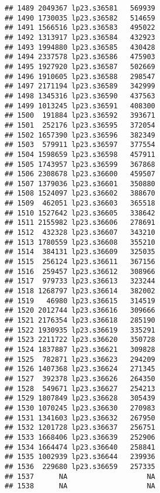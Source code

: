\documentclass[
]{article}
\begin{document}
\begin{verbatim}
## 1489 2049367 lp23.s36581   569939
## 1490 1730035 lp23.s36582   514659
## 1491 1566516 lp23.s36583   495022
## 1492 1313917 lp23.s36584   432923
## 1493 1994880 lp23.s36585   430428
## 1494 2337578 lp23.s36586   475903
## 1495 1927920 lp23.s36587   502669
## 1496 1910605 lp23.s36588   298547
## 1497 2171194 lp23.s36589   342999
## 1498 1345316 lp23.s36590   437563
## 1499 1013245 lp23.s36591   408300
## 1500  191884 lp23.s36592   393671
## 1501  252176 lp23.s36595   372054
## 1502 1657390 lp23.s36596   382349
## 1503  579911 lp23.s36597   377554
## 1504 1598659 lp23.s36598   457911
## 1505 1743957 lp23.s36599   367868
## 1506 2308678 lp23.s36600   459507
## 1507 1379036 lp23.s36601   350880
## 1508 1524097 lp23.s36602   388670
## 1509  462051 lp23.s36603   365518
## 1510 1527642 lp23.s36605   338642
## 1511 2155982 lp23.s36606   278691
## 1512  432328 lp23.s36607   343210
## 1513 1780559 lp23.s36608   355210
## 1514  384131 lp23.s36609   325035
## 1515  256124 lp23.s36611   367156
## 1516  259457 lp23.s36612   308966
## 1517  979733 lp23.s36613   323244
## 1518 1268797 lp23.s36614   382002
## 1519   46980 lp23.s36615   314519
## 1520 2012744 lp23.s36616   309666
## 1521 2176354 lp23.s36618   285190
## 1522 1930935 lp23.s36619   335291
## 1523 2211722 lp23.s36620   350728
## 1524 1837887 lp23.s36621   309828
## 1525  782871 lp23.s36623   294209
## 1526 1407368 lp23.s36624   271345
## 1527  392378 lp23.s36626   264350
## 1528  549671 lp23.s36627   254213
## 1529 1807849 lp23.s36628   305439
## 1530 1070245 lp23.s36630   270983
## 1531 1341603 lp23.s36632   267950
## 1532 1201728 lp23.s36637   256751
## 1533 1668406 lp23.s36639   252906
## 1534 1664474 lp23.s36640   258841
## 1535 1002939 lp23.s36644   239936
## 1536  229680 lp23.s36659   257335
## 1537      NA                   NA
## 1538      NA                   NA
\end{verbatim}
\end{document}

